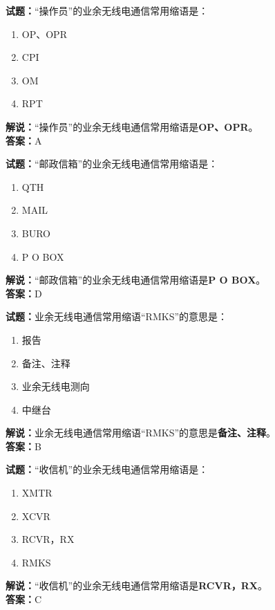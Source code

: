 \documentclass{ctexbook}
\begin{document}
\bigskip


\noindent\textbf{试题：}“操作员”的业余无线电通信常用缩语是：
\begin{enumerate}[leftmargin=3em]
\item OP、OPR
\item CPI
\item OM
\item RPT
\end{enumerate}
\noindent\textbf{解说：}“操作员”的业余无线电通信常用缩语是\textbf{OP、OPR}。\\\noindent\textbf{答案：}A



\bigskip


\noindent\textbf{试题：}“邮政信箱”的业余无线电通信常用缩语是：
\begin{enumerate}[leftmargin=3em]
\item QTH
\item MAIL
\item BURO
\item P O BOX
\end{enumerate}
\noindent\textbf{解说：}“邮政信箱”的业余无线电通信常用缩语是\textbf{P O BOX}。\\\noindent\textbf{答案：}D



\bigskip


\noindent\textbf{试题：}业余无线电通信常用缩语“RMKS”的意思是：
\begin{enumerate}[leftmargin=3em]
\item 报告
\item 备注、注释
\item 业余无线电测向
\item 中继台
\end{enumerate}
\noindent\textbf{解说：}业余无线电通信常用缩语“RMKS”的意思是\textbf{备注、注释}。\\\noindent\textbf{答案：}B



\bigskip


\noindent\textbf{试题：}“收信机”的业余无线电通信常用缩语是：
\begin{enumerate}[leftmargin=3em]
\item XMTR
\item XCVR
\item RCVR，RX
\item RMKS
\end{enumerate}
\noindent\textbf{解说：}“收信机”的业余无线电通信常用缩语是\textbf{RCVR，RX}。\\\noindent\textbf{答案：}C
\end{document}
